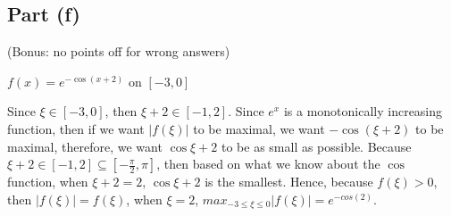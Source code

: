\subsection{Part (f)}

\begin{question}
(Bonus: no points off for wrong answers)
\begin{center}
    $f(x) = e^{−\cos{(x+2)}}$ on $[−3,0]$
\end{center}
\end{question}

\begin{answer}
    Since $\xi \in [-3,0]$, then $\xi + 2 \in [-1,2]$. Since $e^x$ is a monotonically increasing function, then if we want $\lvert f(\xi) \rvert$ to be maximal, we want $-\cos{(\xi+2)}$ to be maximal, therefore, we want $\cos{\xi + 2}$ to be as small as possible. Because $\xi + 2 \in [-1,2] \subseteq \left[-\tfrac{\pi}{2},\pi\right]$, then based on what we know about the $\cos$ function, when $\xi + 2 = 2$, $\cos{\xi + 2}$ is the smallest.  Hence, because $f(\xi) > 0$, then $\lvert f(\xi) \rvert = f(\xi)$, when $\xi = 2$, $max_{-3 \leq \xi \leq 0}{\lvert f(\xi) \rvert} = e^{-cos(2)}$.
\end{answer}